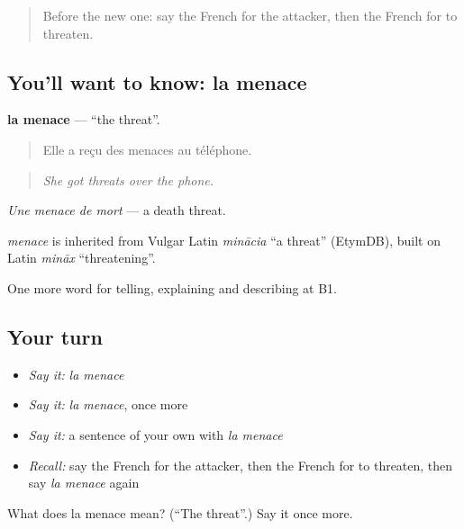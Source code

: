 \label{lesson:FR-C289-menace}



\begin{quote}
Before the new one: say the French for the attacker, then the French for to threaten.
\end{quote}

\subsection*{You'll want to know: la menace}
\textbf{la menace} — \textquotedblleft{}the threat\textquotedblright{}.

\begin{quote}
Elle a reçu des menaces au téléphone.
\end{quote}

\begin{quote}
\emph{She got threats over the phone.}
\end{quote}

\emph{Une menace de mort} — a death threat.

\begin{cousinweb}
\emph{menace} is inherited from Vulgar Latin \emph{minācia} \textquotedblleft{}a threat\textquotedblright{} (EtymDB), built on Latin \emph{mināx} \textquotedblleft{}threatening\textquotedblright{}.
\end{cousinweb}

\begin{grammarlens}[title={What you've built}]
One more word for telling, explaining and describing at B1.
\end{grammarlens}

\subsection*{Your turn}
\begin{itemize}
\raggedright
  \item \emph{Say it:} \emph{la menace}
  \item \emph{Say it:} \emph{la menace}, once more
  \item \emph{Say it:} a sentence of your own with \emph{la menace}
  \item \emph{Recall:} say the French for the attacker, then the French for to threaten, then say \emph{la menace} again
\end{itemize}

\begin{tcolorbox}[breakable,colback=teal!4,colframe=teal!35!black,title={Before you move on}]
What does la menace mean? (\textquotedblleft{}The threat\textquotedblright{}.) Say it once more.
\end{tcolorbox}
